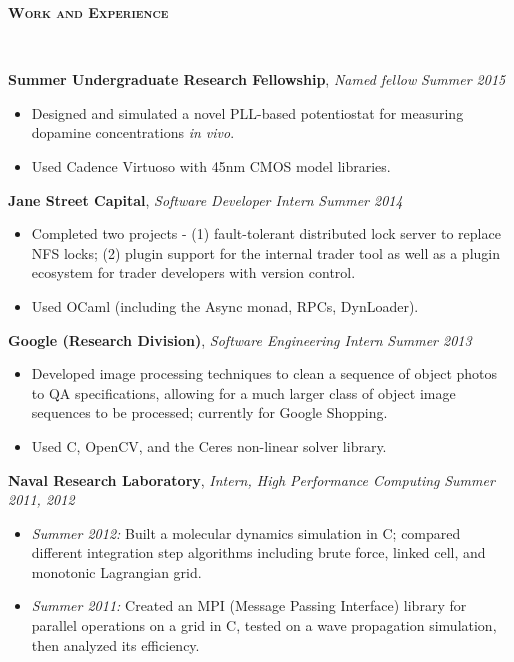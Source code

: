 \documentclass{article}
\newenvironment{changemargin}[2]{%
  \begin{list}{}{%
    \setlength{\topsep}{0pt}%
    \setlength{\leftmargin}{#1}%
    \setlength{\rightmargin}{#2}%
    \setlength{\listparindent}{\parindent}%
    \setlength{\itemindent}{\parindent}%
    \setlength{\parsep}{\parskip}%
  }%
  \item[]}{\end{list}
}
\newcommand{\lineover}{
	\begin{changemargin}{-0.05in}{-0.05in}
		\vspace*{-8pt}
		\hrulefill \\
		\vspace*{-2pt}
	\end{changemargin}
}
\newcommand{\header}[1]{
	\begin{changemargin}{-.5in}{-0.5in}
		{\large \textbf{\scshape{#1}}}\\
  	\lineover
	\end{changemargin}
}
\newenvironment{body} {
	\vspace*{-16pt}
	\begin{changemargin}{-0.25in}{-0.5in}
  }	
	{\end{changemargin}
}
\newcommand{\CC}{C\nolinebreak\hspace{-.05em}\raisebox{.4ex}{\tiny\bf +}\nolinebreak\hspace{-.10em}\raisebox{.4ex}{\tiny\bf +}}
\begin{document}
\smallskip


\header{Work and Experience}

\begin{body}
	\vspace{14pt}
	
	\textbf{Summer Undergraduate Research Fellowship}, \emph{Named fellow} \hfill \emph{Summer 2015}\\
	\vspace*{-4pt}
	\begin{itemize}
		\item Designed and simulated a novel PLL-based potentiostat for measuring dopamine concentrations \emph{in vivo}.
		\item Used Cadence Virtuoso with 45nm CMOS model libraries. %
	\end{itemize}

	\smallskip

	\textbf{Jane Street Capital}, \emph{Software Developer Intern} \hfill \emph{Summer 2014}\\
	\vspace*{-4pt}
	\begin{itemize}
		\item Completed two projects - (1) fault-tolerant distributed lock server to replace NFS locks; (2) plugin support for the internal trader tool as well as a plugin ecosystem for trader developers with version control.
		\item Used OCaml (including the Async monad, RPCs, DynLoader).
	\end{itemize}

	\smallskip

	\textbf{Google (Research Division)}, \emph{Software Engineering Intern} \hfill \emph{Summer 2013}\\
	\vspace*{-4pt}
	\begin{itemize}
		\item Developed image processing techniques to clean a sequence of object photos to QA specifications, allowing for a much larger class of object image sequences to be processed; currently for Google Shopping.
		\item Used \CC, OpenCV, and the Ceres non-linear solver library.
	\end{itemize}

	\smallskip

	\textbf{Naval Research Laboratory}, \emph{Intern, High Performance Computing} \hfill \emph{Summer 2011, 2012}\\
	\vspace*{-4pt}
	\begin{itemize}
		\item \emph{Summer 2012:} Built a molecular dynamics simulation in C; compared different integration step algorithms including brute force, linked cell, and monotonic Lagrangian grid.
		\item \emph{Summer 2011:} Created an MPI (Message Passing Interface) library for parallel operations on a grid in \CC, tested on a wave propagation simulation, then analyzed its efficiency.
	\end{itemize}


\end{body}
\end{document}
